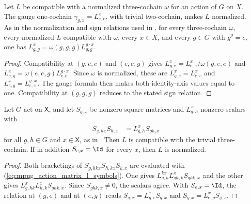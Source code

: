 \begin{lemma}
    \label{thm:asymex_l_symbol_normalization}
    \leanok
    Let $L$ be compatible with a normalized three-cochain $\omega$ for an
    action of $G$ on $X$. The gauge one-cochain
    $\gamma_{g,x}=L^x_{e,e}$, with trivial two-cochain, makes $L$
    normalized. As in the normalization and sign relations used in
    \cite[Section~6]{GarreRubio2023MPOSym}, for every three-cochain $\omega$,
    every normalized $L$ compatible with $\omega$, every $x\in X$, and every
    $g\in G$ with $g^2=e$, one has
    $L^x_{g,g}=\omega(g,g,g)L^{g\cdot x}_{g,g}$.
\end{lemma}
\begin{proof}
    \leanok
    Compatibility at $(g,e,e)$ and $(e,e,g)$ gives
    $L^x_{g,e}=L^x_{e,e}/\omega(g,e,e)$ and
    $L^x_{e,g}=\omega(e,e,g)L^{g\cdot x}_{e,e}$. Since $\omega$ is normalized,
    these are $L^x_{g,e}=L^x_{e,e}$ and $L^x_{e,g}=L^{g\cdot x}_{e,e}$.
    The gauge formula then makes both identity-axis values equal to one.
    Compatibility at $(g,g,g)$ reduces to the stated sign relation.
\end{proof}

\begin{lemma}
    \label{thm:mpug_l_symbols_action_matrices}
    \leanok
    Let $G$ act on $\mathsf X$, and let $S_{g,x}$ be nonzero square matrices
    and $L^x_{g,h}$ nonzero scalars with
    \begin{align}
        S_{g,hx}S_{h,x} & =L^x_{g,h}S_{gh,x}
        \label{eq:mpug_action_matrix_l_symbols}
    \end{align}
    for all $g,h\in G$ and $x\in\mathsf X$, as in
    \cite[lines~4363--4368]{FrancoRubio2025MPUGauging}. Then $L$ is compatible
    with the trivial three-cochain. If in addition $S_{e,x}=\Id$ for every $x$,
    then $L$ is normalized.
\end{lemma}
\begin{proof}\leanok
    Both bracketings of $S_{g,hkx}S_{h,kx}S_{k,x}$ are evaluated with
    (\ref{eq:mpug_action_matrix_l_symbols}). One gives
    $L^{kx}_{g,h}L^x_{gh,k}S_{ghk,x}$ and the other gives
    $L^x_{g,hk}L^x_{h,k}S_{ghk,x}$. Since $S_{ghk,x}\neq0$, the scalars agree.
    With $S_{e,x}=\Id$, the relation at $(g,e)$ and at $(e,g)$ reads
    $S_{g,x}=L^x_{g,e}S_{g,x}$ and $S_{g,x}=L^x_{e,g}S_{g,x}$.
\end{proof}

